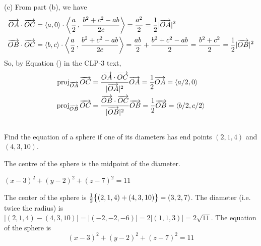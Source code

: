\begin{solution}
(c) From part (b), we have
\begin{align*}
\overrightarrow{OA}\cdot\overrightarrow{OC}
&=\left< a,0\right>\cdot\left<\frac{a}{2}\,,\,\frac{b^2+c^2-ab}{2c}\right>
=\frac{a^2}{2}=\frac{1}{2}|\overrightarrow{OA}|^2\\
\overrightarrow{OB}\cdot\overrightarrow{OC}
&=\left< b,c\right>\cdot\left<\frac{a}{2}\,,\,\frac{b^2+c^2-ab}{2c}\right>
=\frac{ab}{2}+\frac{b^2+c^2-ab}{2}=\frac{b^2+c^2}{2}
=\frac{1}{2}|\overrightarrow{OB}|^2 
\end{align*}
So, by Equation () in the CLP-3 text,
\begin{align*}
\text{proj}_{\overrightarrow{\scriptstyle OA}}\,\overrightarrow{OC}
&=\frac{\overrightarrow{OA}\cdot\overrightarrow{OC}}{|\overrightarrow{OA}|^2}
           \overrightarrow{OA}
=\frac{1}{2}\overrightarrow{OA}
=\left< a/2,0\right> \\
\text{proj}_{\overrightarrow{\scriptstyle OB}}\,\overrightarrow{OC}
&=\frac{\overrightarrow{OB}\cdot\overrightarrow{OC}}{|\overrightarrow{OB}|^2}
           \overrightarrow{OB}
=\frac{1}{2}\overrightarrow{OB}
=\left< b/2,c/2\right>
\end{align*}


\end{solution}







\subsection*{\Procedural}

\begin{question}
Find the equation of a sphere if one of its diameters has end
points $(2,1,4)$ and $(4,3,10)$.
\end{question}

\begin{hint}
The centre of the sphere is the midpoint of the diameter.
\end{hint}

\begin{answer}
$(x-3)^2+(y-2)^2+(z-7)^2=11$
\end{answer}

\begin{solution}
The center of the sphere is 
$\tfrac{1}{2}\big\{(2,1,4)+(4,3,10)\big\}=(3,2,7)$. The diameter (i.e. twice the radius) is $|(2,1,4)-(4,3,10)|=|(-2,-2,-6)|=2|(1,1,3)|=2\sqrt{11}$.
The equation of the sphere is
\begin{equation*}
(x-3)^2+(y-2)^2+(z-7)^2=11
\end{equation*}
\end{solution}

